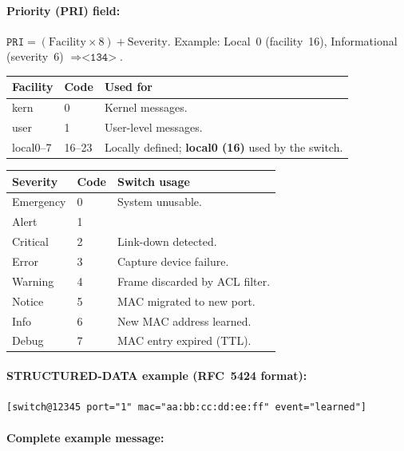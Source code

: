 \documentclass[12pt,a4paper]{article}
\begin{document}
\paragraph{Priority (PRI) field:}
$\texttt{PRI} = (\mathrm{Facility} \times 8) + \mathrm{Severity}$.
Example: Local~0 (facility~16), Informational (severity~6)
$\Rightarrow \texttt{<134>}$.

\begin{center}
\begin{tabular}{lll}
\toprule
\textbf{Facility} & \textbf{Code} & \textbf{Used for} \\
\midrule
kern      & 0  & Kernel messages. \\
user      & 1  & User-level messages. \\
local0--7 & 16--23 & Locally defined; \textbf{local0 (16)} used by the switch. \\
\bottomrule
\end{tabular}
\end{center}

\begin{center}
\begin{tabular}{lll}
\toprule
\textbf{Severity} & \textbf{Code} & \textbf{Switch usage} \\
\midrule
Emergency  & 0 & System unusable. \\
Alert      & 1 & \\
Critical   & 2 & Link-down detected. \\
Error      & 3 & Capture device failure. \\
Warning    & 4 & Frame discarded by ACL filter. \\
Notice     & 5 & MAC migrated to new port. \\
Info       & 6 & New MAC address learned. \\
Debug      & 7 & MAC entry expired (TTL). \\
\bottomrule
\end{tabular}
\end{center}

\paragraph{STRUCTURED-DATA example (RFC~5424 format):}

\texttt{[switch@12345 port="1" mac="aa:bb:cc:dd:ee:ff" event="learned"]}

\paragraph{Complete example message:}
\end{document}
